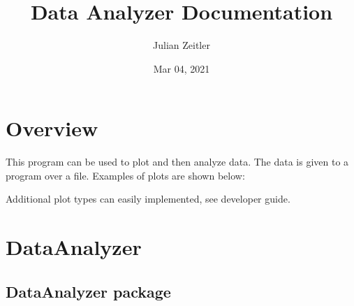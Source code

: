 \documentclass[letterpaper,10pt,english]{sphinxmanual}
\title{Data Analyzer Documentation}
\date{Mar 04, 2021}
\author{Julian Zeitler}
\begin{document}
\pagestyle{empty}
\sphinxmaketitle
\pagestyle{plain}
\sphinxtableofcontents
\pagestyle{normal}
\label{\detokenize{index::doc}}



\chapter{Overview}
\label{\detokenize{overview:overview}}\label{\detokenize{overview::doc}}
This program can be used to plot and then analyze data.
The data is given to a program over a  file. Examples of plots are shown below:

\begin{figure}[htbp]
\centering
\capstart

\noindent{}
\caption{}\label{\detokenize{overview:id1}}\end{figure}

\begin{figure}[htbp]
\centering
\capstart

\noindent{}
\caption{}\label{\detokenize{overview:id2}}\end{figure}

\begin{figure}[htbp]
\centering
\capstart

\noindent{}
\caption{}\label{\detokenize{overview:id3}}\end{figure}

\begin{figure}[htbp]
\centering
\capstart

\noindent{}
\caption{}\label{\detokenize{overview:id4}}\end{figure}

Additional plot types can easily implemented, see developer guide.


\chapter{DataAnalyzer}
\label{\detokenize{modules:dataanalyzer}}\label{\detokenize{modules::doc}}

\section{DataAnalyzer package}
\label{\detokenize{DataAnalyzer:dataanalyzer-package}}\label{\detokenize{DataAnalyzer::doc}}
\end{document}
